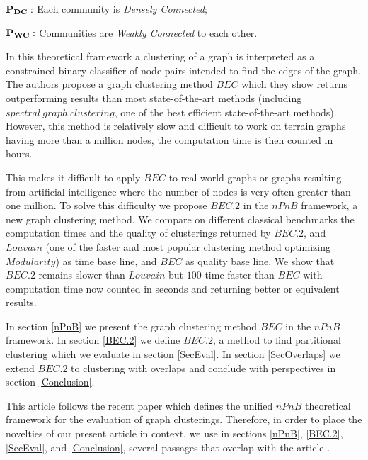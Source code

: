 \documentclass[12pt]{article}
\theoremstyle{thmstyleone}%
\theoremstyle{definition}
\begin{document}
    \hspace{1cm}$\bf P_{DC}:$ Each community is {\it Densely Connected}; \vspace{-0.10cm}

    \hspace{1cm}$\bf P_{WC}:$  Communities are {\it Weakly Connected} to each other.

In this theoretical framework a clustering of a graph is interpreted as a constrained binary classifier of node pairs intended to find the edges of the graph.
%
The authors propose a graph clustering method $BEC$ which they show returns outperforming results than most state-of-the-art methods (including $spectral~graph~clustering$, one of the best efficient state-of-the-art methods). %
However, this method is relatively slow and difficult to work on terrain graphs having more than a million nodes, the computation time is then counted in hours.

This makes it difficult to apply $BEC$ to real-world graphs or graphs resulting from artificial intelligence where the number of nodes is very often greater than one million.
To solve this difficulty we propose $BEC.2$ in the $nPnB$ framework, a new  graph clustering method.
%
We compare on different classical benchmarks the computation times and the quality of clusterings
returned by $BEC.2$, and $Louvain$ (one of the faster and most popular clustering method optimizing $Modularity$) as time base line, and $BEC$ as quality base line.
%
We show that $BEC.2$ remains slower than $Louvain$ but $100$ time faster than $BEC$ with computation time now counted in seconds and returning better or equivalent results.

In section \ref{nPnB} we present the graph clustering method $BEC$ in the $nPnB$ framework.
In section \ref{BEC.2} we define $BEC.2$, a method to find partitional clustering which we evaluate in section \ref{SecEval}.
In section \ref{SecOverlaps} we extend $BEC.2$ to clustering with overlaps
and conclude with perspectives in section \ref{Conclusion}.

This article follows the recent paper \cite{Gaume_BEC1_2025}
which defines the unified $nPnB$ theoretical framework for the evaluation of graph clusterings.
Therefore, in order to place the novelties of our present article in context, we use in sections \ref{nPnB}, \ref{BEC.2}, \ref{SecEval}, and \ref{Conclusion}, several passages that overlap with the article \cite{Gaume_BEC1_2025}.
\end{document}
